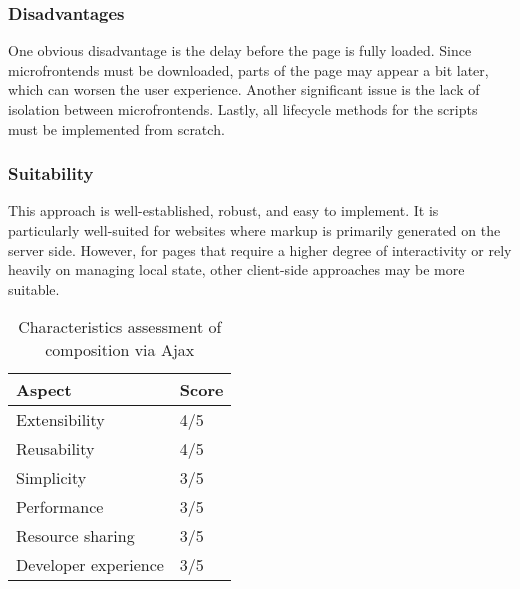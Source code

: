 \subsubsection{Disadvantages}
One obvious disadvantage is the delay before the page is fully loaded. Since microfrontends must be downloaded, parts of the page may appear a bit later, which can worsen the user experience. Another significant issue is the lack of isolation between microfrontends. Lastly, all lifecycle methods for the scripts must be implemented from scratch. \cite{Geers}

\subsubsection{Suitability}
This approach is well-established, robust, and easy to implement. It is particularly well-suited for websites where markup is primarily generated on the server side. However, for pages that require a higher degree of interactivity or rely heavily on managing local state, other client-side approaches may be more suitable. \cite{Geers}

\begin{table}[h]
  \centering
  \begin{tabular}{|l|l|}
     \hline
        \textbf{Aspect} & \textbf{Score} \\
     \hline
        Extensibility & 4/5 \\
     \hline
        Reusability & 4/5 \\
     \hline
        Simplicity & 3/5 \\
     \hline
        Performance & 3/5 \\
     \hline
        Resource sharing & 3/5 \\
     \hline
        Developer experience & 3/5 \\
     \hline
  \end{tabular}
  \caption{Characteristics assessment of composition via Ajax}
  \label{table:links-composition}
\end{table}